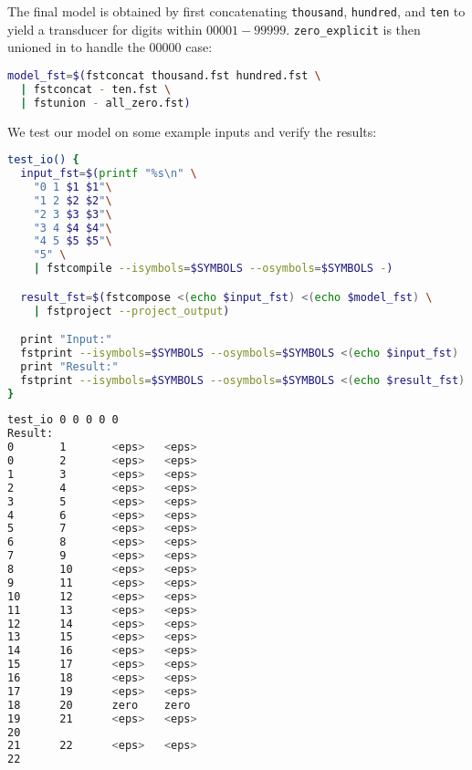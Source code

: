 \documentclass[a4paper,oneside,reqno]{amsart}
\begin{document}
\begin{enumerate}[label=\arabic*.]
    The final model is obtained by first concatenating \texttt{thousand},
    \texttt{hundred}, and \texttt{ten} to yield a transducer for
    digits within $00001-99999$. \texttt{zero\_explicit} is then
    unioned in to handle the $00000$ case:
    \begin{lstlisting}[language=bash]
model_fst=$(fstconcat thousand.fst hundred.fst \
  | fstconcat - ten.fst \
  | fstunion - all_zero.fst)
    \end{lstlisting}

    We test our model on some example inputs and verify the results:
    \begin{lstlisting}[language=bash]
test_io() {
  input_fst=$(printf "%s\n" \
    "0 1 $1 $1"\
    "1 2 $2 $2"\
    "2 3 $3 $3"\
    "3 4 $4 $4"\
    "4 5 $5 $5"\
    "5" \
    | fstcompile --isymbols=$SYMBOLS --osymbols=$SYMBOLS -)

  result_fst=$(fstcompose <(echo $input_fst) <(echo $model_fst) \
    | fstproject --project_output)

  print "Input:"
  fstprint --isymbols=$SYMBOLS --osymbols=$SYMBOLS <(echo $input_fst)
  print "Result:"
  fstprint --isymbols=$SYMBOLS --osymbols=$SYMBOLS <(echo $result_fst)
}
    \end{lstlisting}

    \begin{lstlisting}[language=bash]
test_io 0 0 0 0 0
Result:
0       1       <eps>   <eps>
0       2       <eps>   <eps>
1       3       <eps>   <eps>
2       4       <eps>   <eps>
3       5       <eps>   <eps>
4       6       <eps>   <eps>
5       7       <eps>   <eps>
6       8       <eps>   <eps>
7       9       <eps>   <eps>
8       10      <eps>   <eps>
9       11      <eps>   <eps>
10      12      <eps>   <eps>
11      13      <eps>   <eps>
12      14      <eps>   <eps>
13      15      <eps>   <eps>
14      16      <eps>   <eps>
15      17      <eps>   <eps>
16      18      <eps>   <eps>
17      19      <eps>   <eps>
18      20      zero    zero
19      21      <eps>   <eps>
20
21      22      <eps>   <eps>
22
    \end{lstlisting}


\end{enumerate}
\end{document}

